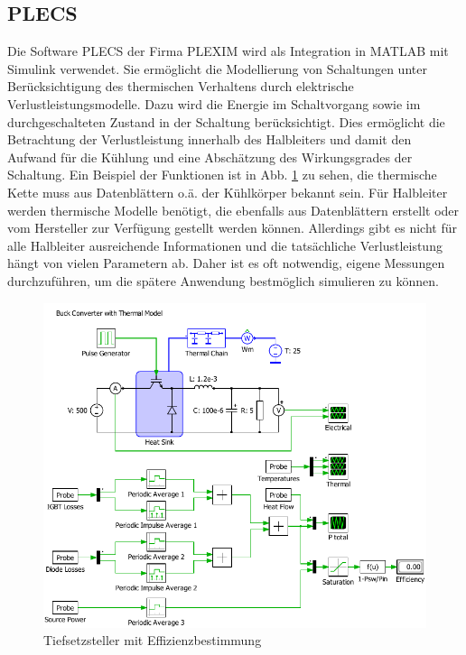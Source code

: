	\subsection{PLECS}
	Die Software \gls{PLECS} der Firma PLEXIM wird als Integration in MATLAB mit Simulink verwendet.  Sie ermöglicht die Modellierung von Schaltungen unter Berücksichtigung des thermischen Verhaltens durch elektrische Verlustleistungsmodelle. Dazu wird die Energie im Schaltvorgang sowie im durchgeschalteten Zustand in der Schaltung berücksichtigt. Dies ermöglicht die Betrachtung der Verlustleistung innerhalb des Halbleiters und damit den Aufwand für die Kühlung und eine Abschätzung des Wirkungsgrades der Schaltung. Ein Beispiel der Funktionen ist in Abb. \ref{fig:plecsbuck} zu sehen, die thermische Kette muss aus Datenblättern o.ä. der Kühlkörper bekannt sein. Für Halbleiter werden thermische Modelle benötigt, die ebenfalls aus Datenblättern erstellt oder vom Hersteller zur Verfügung gestellt werden können. Allerdings gibt es nicht für alle Halbleiter ausreichende Informationen und die tatsächliche Verlustleistung hängt von vielen Parametern ab. Daher ist es oft notwendig, eigene Messungen durchzuführen, um die spätere Anwendung bestmöglich simulieren zu können.   \\
	
	\begin{figure}
		\centering
		\includegraphics[width=0.9\linewidth]{content/Grafiken/PLECS_Buck}
		\caption[Tiefsetzsteller mit Effizienzbestimmung]{Tiefsetzsteller mit Effizienzbestimmung}
		\label{fig:plecsbuck}
	\end{figure}
	